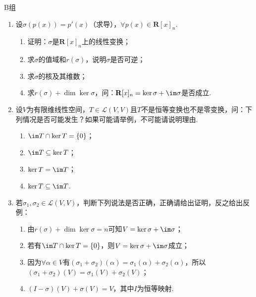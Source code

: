 \centerline{\heiti B组}
\begin{enumerate}
    \item 设$\sigma(p(x))=p'(x)$（求导），$\forall p(x) \in \mathbf{R}[x]_n$.
          \begin{enumerate}
              \item 证明：$\sigma$是$\mathbf{R}[x]_n$上的线性变换；

              \item 求$\sigma$的值域和$r(\sigma)$，说明$\sigma$是否可逆；

              \item 求$\sigma$的核及其维数；

              \item 求$r(\sigma)+\dim\ker\sigma$，问：$\mathbf{R}[x]_n=\ker\sigma+\im \sigma$是否成立.
          \end{enumerate}

    \item 设$V$为有限维线性空间，$T\in \mathcal{L}(V,V)$且$T$不是恒等变换也不是零变换，问：下列情况是否可能发生？如果可能请举例，不可能请说明理由.
          \begin{enumerate}
              \item $\im T \cap \ker T = \{0\}$；

              \item $\im T \subseteq \ker T$；

              \item $\ker T = \im T$；

              \item $\ker T \subseteq \im T$.
          \end{enumerate}

    \item 若$\sigma_1,\sigma_2\in \mathcal{L}(V,V)$，判断下列说法是否正确，正确请给出证明，反之给出反例：
          \begin{enumerate}
              \item 由$r(\sigma)+\dim\ker\sigma=n$可知$V=\ker\sigma+\im \sigma$；

              \item 若有$\im T \cap \ker T = \{0\}$，则$V=\ker\sigma+\im \sigma$成立；

              \item 因为$\forall \alpha \in V$有$(\sigma_1+\sigma_2)(\alpha)=\sigma_1(\alpha)+\sigma_2(\alpha)$，所以$(\sigma_1+\sigma_2)(V)=\sigma_1(V)+\sigma_2(V)$；

              \item $(I-\sigma)(V)+\sigma(V)=V$，其中$I$为恒等映射.
          \end{enumerate}


\end{enumerate}
